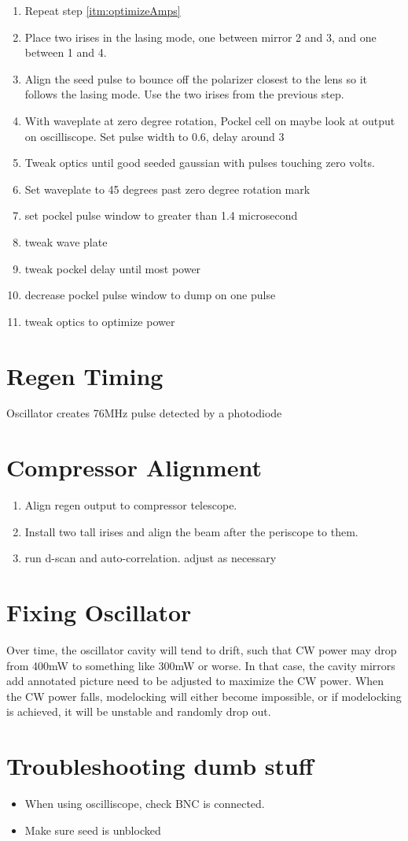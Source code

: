 \documentclass{article}
\begin{document}
\begin{enumerate}
    \item Repeat step \ref{itm:optimizeAmps}
    \item Place two irises in the lasing mode, one between mirror 2 and 3, and one between 1 and 4.
    \item Align the seed pulse to bounce off the polarizer closest to the lens so it follows the lasing mode. Use the two irises from the previous step.
    \item With waveplate at zero degree rotation, Pockel cell on maybe look at output on oscilliscope. Set pulse width to 0.6, delay around 3
    \item Tweak optics until good seeded gaussian with pulses touching zero volts.
    \item Set waveplate to 45 degrees past zero degree rotation mark
    \item set pockel pulse window to greater than 1.4 microsecond
    \item tweak wave plate
    \item tweak pockel delay until most power
    \item decrease pockel pulse window to dump on one pulse
    \item tweak optics to optimize power
\end{enumerate}
\section{Regen Timing}
Oscillator creates 76MHz pulse detected by a photodiode

\section{Compressor Alignment}
\begin{enumerate}
    \item Align regen output to compressor telescope.
    \item Install two tall irises and align the beam after the periscope to them.
    \item run d-scan and auto-correlation. adjust as necessary
\end{enumerate}

\section{Fixing Oscillator}
Over time, the oscillator cavity will tend to drift, such that CW power may drop from 400mW to something like 300mW or worse.
In that case, the cavity mirrors {\color{red} add annotated picture} need to be adjusted to maximize the CW power.
When the CW power falls, modelocking will either become impossible, or if modelocking is achieved, it will be unstable and randomly drop out.

\section{Troubleshooting dumb stuff}
\begin{itemize}
    \item When using oscilliscope, check BNC is connected.
    \item Make sure seed is unblocked
\end{itemize}
\end{document}
